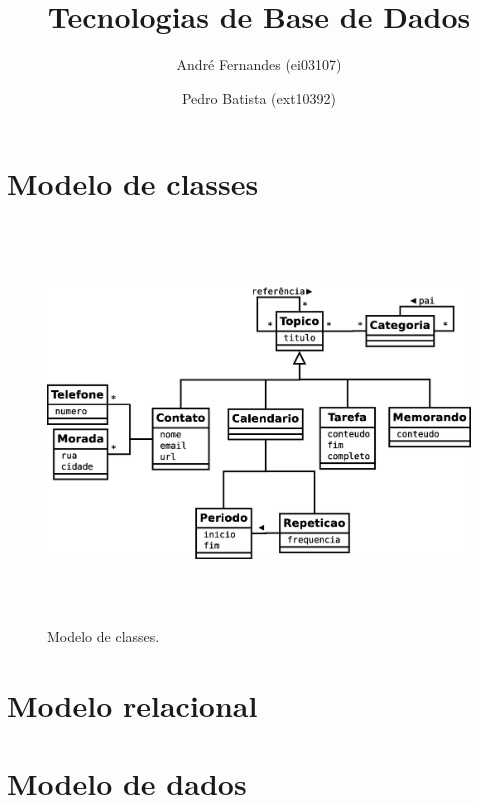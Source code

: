 \documentclass[a4paper,12pt]{article}
\title{Tecnologias de Base de Dados}
\author{André Fernandes (ei03107) \and Pedro Batista (ext10392)}
\begin{document}
\maketitle

\section{Modelo de classes}

	\begin{figure}[htp]
		\begin{center}
			\includegraphics[height=300pt]{uml}
		\end{center}
		\caption{Modelo de classes.}
		\label{fig:uml}
	\end{figure}

\section{Modelo relacional}


\section{Modelo de dados}
\end{document}
